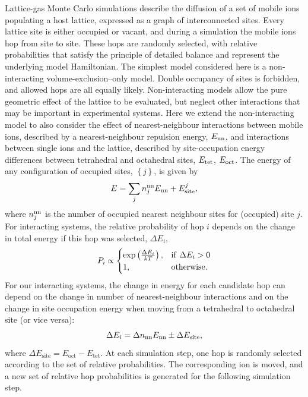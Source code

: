 \documentclass[aps,prb,twocolumn,superscriptaddress,reprint]{revtex4-1}
\newcommand{\set}[1]{\left\{#1\right\}}
\begin{document}
Lattice-gas Monte Carlo simulations describe the diffusion of a set of mobile ions populating a host lattice, expressed as a graph of interconnected sites.\cite{Trudeau_GraphTheoryBook} 
Every lattice site is either occupied or vacant, and during a simulation the mobile ions hop from site to site. 
These hops are randomly selected, with relative probabilities that satisfy the principle of detailed balance and represent the underlying model Hamiltonian. 
The simplest model considered here is a non-interacting volume-exclusion--only model.\cite{Kutner_PhysLett1981} Double occupancy of sites is forbidden, and allowed hops are all equally likely. 
Non-interacting models allow the pure geometric effect of the lattice to be evaluated, but neglect other interactions that may be important in experimental systems. 
Here we extend the non-interacting model to also consider the effect of nearest-neighbour interactions between mobile ions, described by a nearest-neighbour repulsion energy, $E_{\mathrm{nn}}$, and interactions between single ions and the lattice, described by site-occupation energy differences between tetrahedral and octahedral sites, $E_{\mathrm{tet}}$, $E_{\mathrm{oct}}$. 
The energy of any configuration of occupied sites, $\set{j}$, is given by
\begin{equation}
  E = \sum_j n_j^{\mathrm{nn}}E_{\mathrm{nn}} + E_{\mathrm{site}}^j,
\end{equation}
where $n^{\mathrm{nn}}_j$ is the number of occupied nearest neighbour sites for (occupied) site $j$. 
For interacting systems, the relative probability of hop $i$ depends on the change in total energy if this hop was selected, $\Delta E_i$,
\begin{equation}
  P_i \propto 
  \begin{cases}
    \mathrm{exp}\left(\frac{\Delta E_i}{kT}\right),& \mathrm{if}\,\,\Delta E_i > 0 \\
    1,                                        & \mathrm{otherwise.}
  \end{cases}
\end{equation}
For our interacting systems, the change in energy for each candidate hop can depend on the change in number of nearest-neighbour interactions and on the change in site occupation energy when moving from a tetrahedral to octahedral site (or vice versa):
\begin{equation}
  \Delta E_i = \Delta n_{\mathrm{nn}}E_{\mathrm{nn}} \pm \Delta E_{\mathrm{site}},
\end{equation}
where $\Delta E_\mathrm{site}=E_\mathrm{oct}-E_\mathrm{tet}$.
At each simulation step, one hop is randomly selected according to the set of relative probabilities. 
The corresponding ion is moved, and a new set of relative hop probabilities is generated for the following simulation step.
\end{document}
